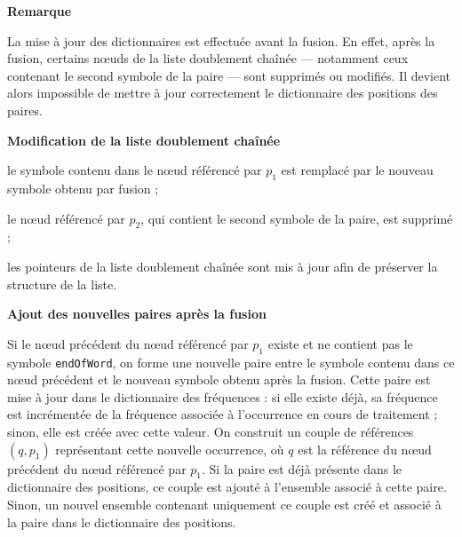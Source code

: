 \documentclass[12pt,a4paper]{report}
\begin{document}
\begin{enumerateFB}
\begin{itemizeFB}
		\end{itemizeFB}
		
		\textbf{Remarque}
		
		La mise à jour des dictionnaires est effectuée avant la fusion. En effet, après la fusion, certains nœuds de la liste doublement chaînée --- notamment ceux contenant le second symbole de la paire --- sont supprimés ou modifiés. Il devient alors impossible de mettre à jour correctement le dictionnaire des positions des paires.
		
		\item \textbf{Modification de la liste doublement chaînée}
		
		\begin{itemizeFB}
			\item le symbole contenu dans le nœud référencé par $p_1$ est remplacé par le nouveau symbole obtenu par fusion ;
			\item le nœud référencé par $p_2$, qui contient le second symbole de la paire, est supprimé ;
			\item les pointeurs de la liste doublement chaînée sont mis à jour afin de préserver la structure de la liste.
		\end{itemizeFB}
		
		\item \textbf{Ajout des nouvelles paires après la fusion}
		
		\begin{itemizeFB}
			\item Si le nœud précédent du nœud référencé par $p_1$ existe et ne contient pas le symbole \texttt{endOfWord}, on forme une nouvelle paire entre le symbole contenu dans ce nœud précédent et le nouveau symbole obtenu après la fusion. Cette paire est mise à jour dans le dictionnaire des fréquences : si elle existe déjà, sa fréquence est incrémentée de la fréquence associée à l’occurrence en cours de traitement ; sinon, elle est créée avec cette valeur. On construit un couple de références $(q, p_1)$ représentant cette nouvelle occurrence, où $q$ est la référence du nœud précédent du nœud référencé par $p_1$. Si la paire est déjà présente dans le dictionnaire des positions, ce couple est ajouté à l’ensemble associé à cette paire. Sinon, un nouvel ensemble contenant uniquement ce couple est créé et associé à la paire dans le dictionnaire des positions.
			

\end{itemizeFB}
\end{enumerateFB}
\end{document}
